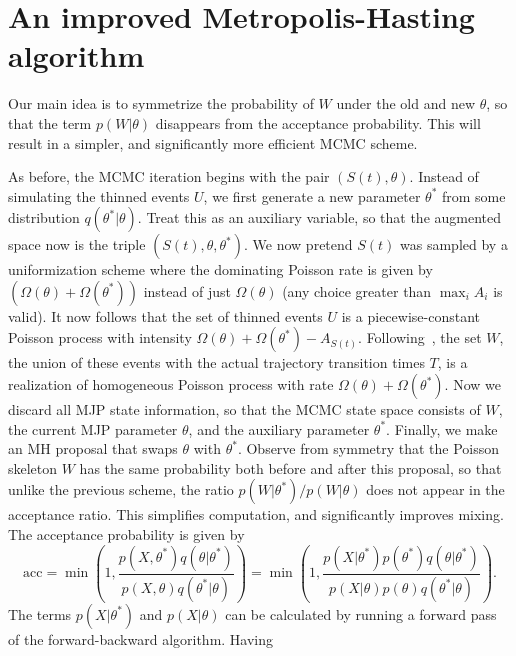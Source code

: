 
\section{An improved Metropolis-Hasting algorithm}

Our main idea is to symmetrize the probability of $W$ under the old and new 
$\theta$, so that the term
$p(W|\theta)$ disappears from the acceptance probability. This will result
in a simpler, and significantly more efficient MCMC scheme.

As before, the MCMC iteration begins with the pair $(S(t), \theta)$. 
Instead of simulating the thinned events $U$, we first generate a new parameter 
$\theta^*$ from some distribution $q(\theta^*|\theta)$. Treat this as an 
auxiliary variable, so that the augmented space now is the triple 
$(S(t), \theta,\theta^*)$. We now pretend $S(t)$ was sampled by a 
uniformization scheme where the dominating Poisson rate is given by 
$(\Omega(\theta) + \Omega(\theta^*))$ instead of just $\Omega(\theta)$ 
(any choice greater than $\max_i A_i$ is valid).
It now follows that the set of thinned events $U$ is a piecewise-constant
Poisson process with intensity $\Omega(\theta) + \Omega(\theta^*) - 
A_{S(t)}$. Following~\cite{RaoTeh13}, the set $W$, the union of these events 
with the actual
trajectory transition times $T$, is a realization of homogeneous Poisson
process with rate $\Omega(\theta) + \Omega(\theta^*)$. Now we discard all MJP 
state information, so that the MCMC state space consists of $W$, the current
MJP parameter $\theta$, and the auxiliary parameter $\theta^*$.
Finally, we make an MH proposal that swaps $\theta$ with $\theta^*$. 
Observe from
symmetry that the Poisson skeleton $W$ has the same probability both
before and after this proposal, so that unlike the previous scheme,
the ratio $p(W|\theta^*)/p(W|\theta)$ does not appear in the acceptance 
ratio. This simplifies computation, and significantly improves mixing.
The acceptance probability 
is given by
$$ \text{acc} = 
  \min\left(1, \frac{p(X,\theta^*)q(\theta|\theta^*)}
   {p(X,\theta)q(\theta^*|\theta)}\right) = 
  \min\left(1, \frac{p(X|\theta^*)p(\theta^*)q(\theta|\theta^*)}
   {p(X|\theta)p(\theta)q(\theta^*|\theta)}\right).
   $$
   The terms $p(X|\theta^*)$ and  $p(X|\theta)$ can be calculated by 
   running a forward pass of the forward-backward algorithm. Having
